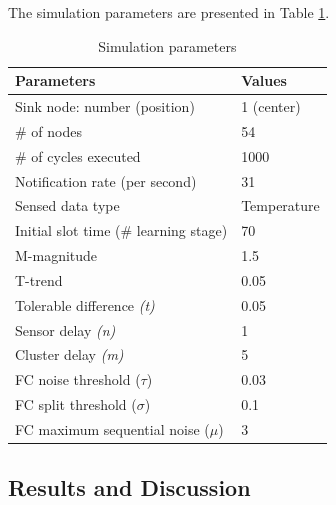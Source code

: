 \documentclass{acm_proc_article-sp}
\begin{document}
The simulation parameters are presented in Table \ref{tab:parameters}.

\begin{table}[h!]
\caption{Simulation parameters}
\label{tab:parameters}
\begin{center}
\begin{tabular}{|l||l|}
\hline
Parameters &Values\\
\hline\hline
Sink node: number (position) &1 (center) \\
\hline
\# of nodes &54 \\
\hline
\# of cycles executed &1000 \\
\hline
Notification rate (per second) &31 \\
\hline
Sensed data type &Temperature \\
\hline
Initial slot time (\# learning stage) &70 \\
\hline
M-magnitude &1.5 \\
\hline
T-trend &0.05 \\
\hline
Tolerable difference {\it(t)} &0.05 \\
\hline
Sensor delay {\it(n)} &1 \\
\hline
Cluster delay {\it(m)} &5 \\
\hline
FC noise threshold ($\tau$) &0.03 \\
\hline
FC split threshold ($\sigma$) &0.1 \\
\hline
FC maximum sequential noise ($\mu$) &3 \\
\hline
\end{tabular}
\end{center}
\end{table}


\subsection{Results and Discussion}
\label{results-and-discussion}


\end{document}
